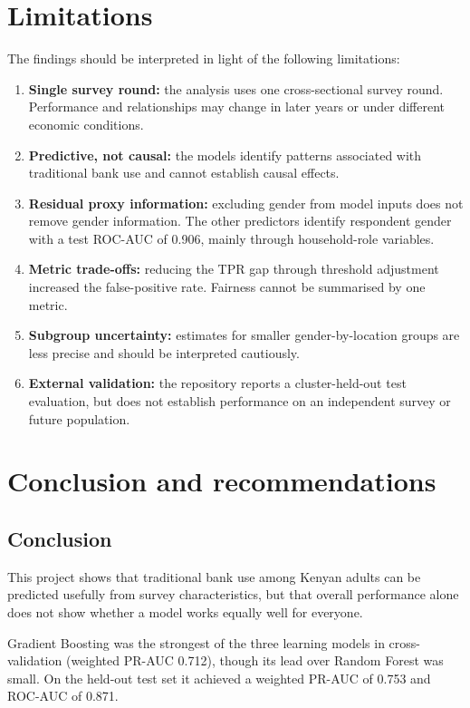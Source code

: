 \documentclass[11pt,a4paper]{article}
\begin{document}
\section{Limitations}

The findings should be interpreted in light of the following limitations:
\begin{enumerate}[leftmargin=*]
  \item \textbf{Single survey round:} the analysis uses one cross-sectional survey round. Performance and relationships may change in later years or under different economic conditions.
  \item \textbf{Predictive, not causal:} the models identify patterns associated with traditional bank use and cannot establish causal effects.
  \item \textbf{Residual proxy information:} excluding gender from model inputs does not remove gender information. The other predictors identify respondent gender with a test ROC-AUC of 0.906, mainly through household-role variables.
  \item \textbf{Metric trade-offs:} reducing the TPR gap through threshold adjustment increased the false-positive rate. Fairness cannot be summarised by one metric.
  \item \textbf{Subgroup uncertainty:} estimates for smaller gender-by-location groups are less precise and should be interpreted cautiously.
  \item \textbf{External validation:} the repository reports a cluster-held-out test evaluation, but does not establish performance on an independent survey or future population.
\end{enumerate}


\section{Conclusion and recommendations}

\subsection{Conclusion}

This project shows that traditional bank use among Kenyan adults can be predicted usefully from survey characteristics, but that overall performance alone does not show whether a model works equally well for everyone.

Gradient Boosting was the strongest of the three learning models in cross-validation (weighted PR-AUC 0.712), though its lead over Random Forest was small. On the held-out test set it achieved a weighted PR-AUC of 0.753 and ROC-AUC of 0.871.
\end{document}
